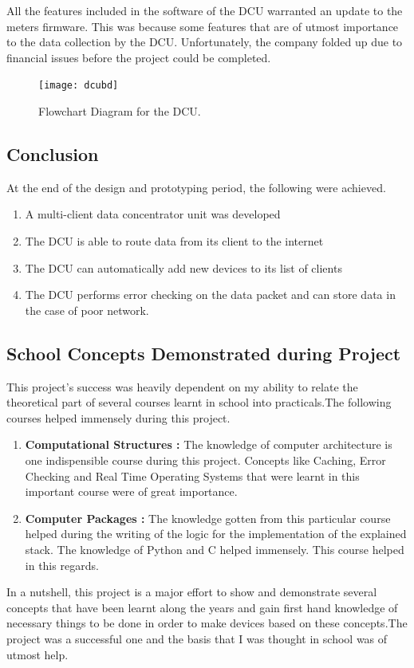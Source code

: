 All the features included in the software of the DCU warranted an update to the meters firmware. This was because some features that are of utmost importance to the data collection by the DCU. Unfortunately, the company folded up due to financial issues before the project could be completed.

\begin{figure}[p]
\texttt{[image: dcubd]}
\centering
\caption{Flowchart Diagram for the DCU.}
\centering
\label{fig:dcu_bd}

\end{figure}

\subsection{Conclusion}
At the end of the design and prototyping period, the following were achieved.
\begin{enumerate}
\item A multi-client data concentrator unit was developed
\item The DCU is able to route data from its client to the internet
\item The DCU can automatically add new devices to its list of clients
\item The DCU performs error checking on the data packet and can store data in the case of poor network.
\end{enumerate}

\subsection{School Concepts Demonstrated during Project}
This project's success was heavily dependent on my ability to relate the theoretical part of several courses learnt in school into practicals.The following courses helped immensely during this project.
\begin{enumerate}
\item \textbf{Computational Structures :} The knowledge of computer architecture is one indispensible course during this project. Concepts like Caching, Error Checking and Real Time Operating Systems that were learnt in this important course were of great importance.
\item \textbf{Computer Packages :} The knowledge gotten from this particular course helped during the writing of the logic for the implementation of the explained stack. The knowledge of Python and C helped immensely. This course helped in this regards.
\end{enumerate}
In a nutshell, this project is a major effort to show and demonstrate several concepts that have been learnt along the years and gain first hand knowledge of necessary things to be done in order to make devices based on these concepts.The project was a successful one and the basis that I was thought in school was of utmost help.

